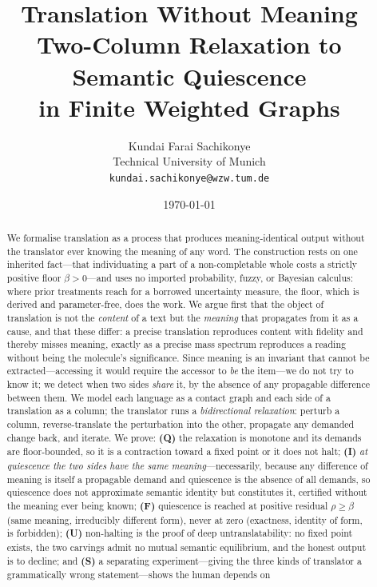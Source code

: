 \documentclass[11pt,a4paper]{article}
\title{\textbf{Translation Without Meaning}\\[3pt]
\large Two-Column Relaxation to Semantic Quiescence\\
in Finite Weighted Graphs}
\author{%
Kundai Farai Sachikonye\\
\small Technical University of Munich\\
\small \texttt{kundai.sachikonye@wzw.tum.de}}
\date{\today}
\theoremstyle{thmstyle}
\theoremstyle{definition}
\theoremstyle{remark}
\newcommand{\flo}{\beta}               %
\newcommand{\res}{\rho}                %
\begin{document}
\maketitle

\begin{abstract}
\noindent
We formalise translation as a process that produces meaning-identical
output without the translator ever knowing the meaning of any word. The
construction rests on one inherited fact---that individuating a part of a
non-completable whole costs a strictly positive floor $\flo>0$---and uses
no imported probability, fuzzy, or Bayesian calculus: where prior treatments
reach for a borrowed uncertainty measure, the floor, which is derived and
parameter-free, does the work. We argue first that the object of translation
is not the \emph{content} of a text but the \emph{meaning} that propagates
from it as a cause, and that these differ: a precise translation reproduces
content with fidelity and thereby misses meaning, exactly as a precise mass
spectrum reproduces a reading without being the molecule's significance.
Since meaning is an invariant that cannot be extracted---accessing it would
require the accessor to \emph{be} the item---we do not try to know it; we
detect when two sides \emph{share} it, by the absence of any propagable
difference between them. We model each language as a contact graph and each
side of a translation as a column; the translator runs a \emph{bidirectional
relaxation}: perturb a column, reverse-translate the perturbation into the
other, propagate any demanded change back, and iterate. We prove:
\textbf{(Q)} the relaxation is monotone and its demands are floor-bounded, so
it is a contraction toward a fixed point or it does not halt; \textbf{(I)}
\emph{at quiescence the two sides have the same meaning}---necessarily,
because any difference of meaning is itself a propagable demand and
quiescence is the absence of all demands, so quiescence does not approximate
semantic identity but constitutes it, certified without the meaning ever
being known; \textbf{(F)} quiescence is reached at positive residual
$\res\ge\flo$ (same meaning, irreducibly different form), never at zero
(exactness, identity of form, is forbidden); \textbf{(U)} non-halting is the
proof of deep untranslatability: no fixed point exists, the two carvings
admit no mutual semantic equilibrium, and the honest output is to decline;
and \textbf{(S)} a separating experiment---giving the three kinds of
translator a grammatically wrong statement---shows the human depends on

\end{abstract}
\end{document}
